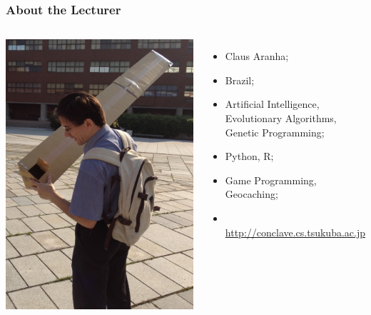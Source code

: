 \documentclass{beamer}
\begin{document}
\begin{frame}
  \frametitle{About the Lecturer}
  \begin{columns}
    \includegraphics[width=1\textwidth]{../img/pinhole}
    {\small
    \begin{itemize}
      \item {} Claus Aranha;
      \item {} Brazil;
        
        \medskip

      \item {} Artificial Intelligence,
        Evolutionary Algorithms, Genetic Programming;
      \item {} Python, R;
      \item {} Game Programming, Geocaching;
        
        \medskip

      \item {}\\ {\smaller \url{http://conclave.cs.tsukuba.ac.jp}}
    \end{itemize}
    }
  \end{columns}
\end{frame}
\end{document}
